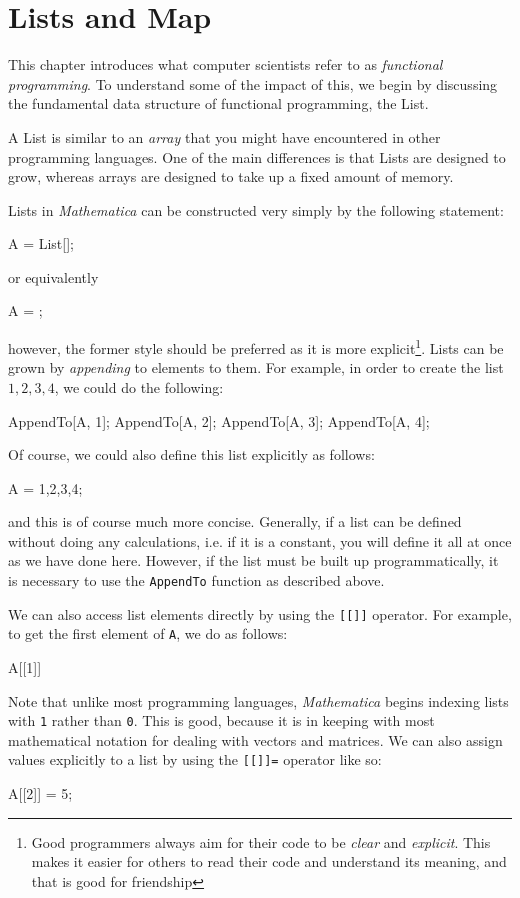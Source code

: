 \chapter{Lists and Map}
\label{chap:ListsMap}
This chapter introduces what computer scientists refer to as \emph{functional programming}. To understand some of the impact of this, we begin by discussing the fundamental data structure of functional programming, the List.

A List is similar to an \emph{array} that you might have encountered in other programming languages. One of the main differences is that Lists are designed to grow, whereas arrays are designed to take up a fixed amount of memory.

Lists in \emph{Mathematica} can be constructed very simply by the following statement:
\begin{code}
	   A = List[];
\end{code}
or equivalently
\begin{code}
	   A = {};
\end{code}
however, the former style should be preferred as it is more explicit\footnote{Good programmers always aim for their code to be \emph{clear} and \emph{explicit}. This makes it easier for others to read their code and understand its meaning, and that is good for friendship}. Lists can be grown by \emph{appending} to elements to them. For example, in order to create the list $1,2,3,4$, we could do the following:
\begin{code}
	   AppendTo[A, 1];
	   AppendTo[A, 2];
	   AppendTo[A, 3];
	   AppendTo[A, 4];
\end{code}

Of course, we could also define this list explicitly as follows:
\begin{code}
	   A = {1,2,3,4};
\end{code}
and this is of course much more concise. Generally, if a list can be defined without doing any calculations, i.e. if it is a constant, you will define it all at once as we have done here. However, if the list must be built up programmatically, it is necessary to use the \texttt{AppendTo} function as described above.

We can also access list elements directly by using the \texttt{[[]]} operator. For example, to get the first element of \texttt{A}, we do as follows:
\begin{code}
	   A[[1]]
\end{code}
Note that unlike most programming languages, \emph{Mathematica} begins indexing lists with \texttt{1} rather than \texttt{0}. This is good, because it is in keeping with most mathematical notation for dealing with vectors and matrices. We can also assign values explicitly to a list by using the \texttt{[[]]=} operator like so:
\begin{code}
	   A[[2]] = 5;
\end{code}

